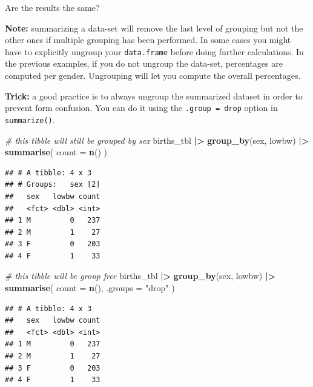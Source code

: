 \documentclass[
]{book}
\newenvironment{Shaded}{\begin{snugshade}}{\end{snugshade}}
\newcommand{\AttributeTok}[1]{\textcolor[rgb]{0.13,0.29,0.53}{#1}}
\newcommand{\CommentTok}[1]{\textcolor[rgb]{0.56,0.35,0.01}{\textit{#1}}}
\newcommand{\FunctionTok}[1]{\textcolor[rgb]{0.13,0.29,0.53}{\textbf{#1}}}
\newcommand{\NormalTok}[1]{#1}
\newcommand{\SpecialCharTok}[1]{\textcolor[rgb]{0.81,0.36,0.00}{\textbf{#1}}}
\newcommand{\StringTok}[1]{\textcolor[rgb]{0.31,0.60,0.02}{#1}}
\begin{document}
Are the results the same?

\textbf{Note:} summarizing a data-set will remove the last level of grouping but not the other ones if multiple grouping has been performed. In some cases you might have to explicitly ungroup your \texttt{data.frame} before doing further calculations.
In the previous examples, if you do not ungroup the data-set, percentages are computed per gender. Ungrouping will let you compute the overall
percentages.

\textbf{Trick:} a good practice is to always ungroup the summarized dataset in order to prevent form confusion. You can do it using the \texttt{.group\ =\ \textquotesingle{}drop\textquotesingle{}} option in \texttt{summarize()}.

\begin{Shaded}
\begin{Highlighting}[]
\CommentTok{\# this tibble will still be grouped by sex}
\NormalTok{births\_tbl }\SpecialCharTok{|\textgreater{}}
  \FunctionTok{group\_by}\NormalTok{(sex, lowbw) }\SpecialCharTok{|\textgreater{}}
  \FunctionTok{summarise}\NormalTok{(}
    \AttributeTok{count =} \FunctionTok{n}\NormalTok{()}
\NormalTok{  )}
\end{Highlighting}
\end{Shaded}

\begin{verbatim}
## # A tibble: 4 x 3
## # Groups:   sex [2]
##   sex   lowbw count
##   <fct> <dbl> <int>
## 1 M         0   237
## 2 M         1    27
## 3 F         0   203
## 4 F         1    33
\end{verbatim}

\begin{Shaded}
\begin{Highlighting}[]
\CommentTok{\# this tibble will be group free}
\NormalTok{births\_tbl }\SpecialCharTok{|\textgreater{}}
  \FunctionTok{group\_by}\NormalTok{(sex, lowbw) }\SpecialCharTok{|\textgreater{}}
  \FunctionTok{summarise}\NormalTok{(}
    \AttributeTok{count =} \FunctionTok{n}\NormalTok{(),}
    \AttributeTok{.groups =} \StringTok{"drop"}
\NormalTok{  )}
\end{Highlighting}
\end{Shaded}

\begin{verbatim}
## # A tibble: 4 x 3
##   sex   lowbw count
##   <fct> <dbl> <int>
## 1 M         0   237
## 2 M         1    27
## 3 F         0   203
## 4 F         1    33
\end{verbatim}
\end{document}
